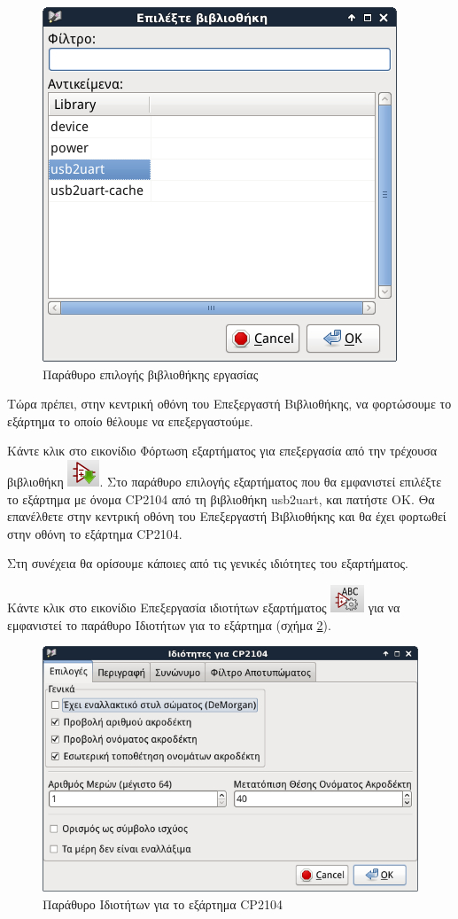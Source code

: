 \documentclass[a4paper]{article}
\begin{document}
\begin{figure}
  \begin{center}
    \includegraphics[width=.5\textwidth]{img/libed-dial-libsel.png}
    \caption{Παράθυρο επιλογής βιβλιοθήκης εργασίας}
    \label{fig:libed-dial-libsel}
  \end{center}
\end{figure}

Τώρα πρέπει, στην κεντρική οθόνη του Επεξεργαστή Βιβλιοθήκης, να φορτώσουμε το εξάρτημα το οποίο θέλουμε να επεξεργαστούμε. 

Κάντε κλικ στο εικονίδιο Φόρτωση εξαρτήματος για επεξεργασία από την τρέχουσα βιβλιοθήκη \includegraphics[scale=.5]{img/libed-ico-loadcomp.png}. Στο παράθυρο επιλογής εξαρτήματος που θα εμφανιστεί επιλέξτε το εξάρτημα με όνομα CP2104 από τη βιβλιοθήκη usb2uart, και πατήστε ΟΚ. Θα επανέλθετε στην κεντρική οθόνη του Επεξεργαστή Βιβλιοθήκης και θα έχει φορτωθεί στην οθόνη το εξάρτημα CP2104.

Στη συνέχεια θα ορίσουμε κάποιες από τις γενικές ιδιότητες του εξαρτήματος. 

Κάντε κλικ στο εικονίδιο Επεξεργασία ιδιοτήτων εξαρτήματος \includegraphics[scale=.5]{img/libed-ico-compprop.png} 
για να εμφανιστεί το παράθυρο Ιδιοτήτων για το εξάρτημα (σχήμα \ref{fig:libed-dial-compprop}). 

\begin{figure}
  \begin{center}
    \includegraphics[width=.5\textwidth]{img/libed-dial-compprop.png}
    \caption{Παράθυρο Ιδιοτήτων για το εξάρτημα CP2104}
    \label{fig:libed-dial-compprop}
  \end{center}
\end{figure}
\end{document}

